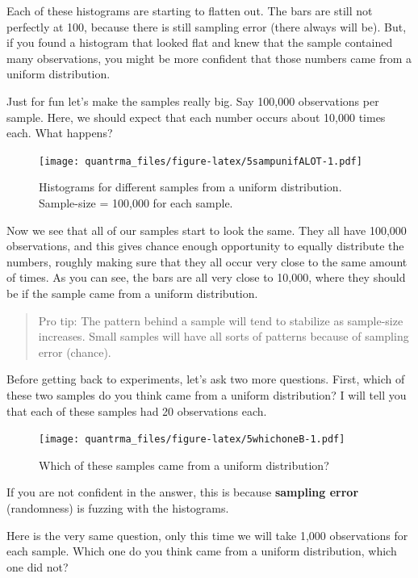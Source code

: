 \documentclass[
]{book}
\begin{document}
Each of these histograms are starting to flatten out. The bars are still not perfectly at 100, because there is still sampling error (there always will be). But, if you found a histogram that looked flat and knew that the sample contained many observations, you might be more confident that those numbers came from a uniform distribution.

Just for fun let's make the samples really big. Say 100,000 observations per sample. Here, we should expect that each number occurs about 10,000 times each. What happens?

\begin{figure}
\centering
\texttt{[image: quantrma\_files/figure-latex/5sampunifALOT-1.pdf]}
\caption{\label{fig:5sampunifALOT}Histograms for different samples from a uniform distribution. Sample-size = 100,000 for each sample.}
\end{figure}

Now we see that all of our samples start to look the same. They all have 100,000 observations, and this gives chance enough opportunity to equally distribute the numbers, roughly making sure that they all occur very close to the same amount of times. As you can see, the bars are all very close to 10,000, where they should be if the sample came from a uniform distribution.

\begin{quote}
Pro tip: The pattern behind a sample will tend to stabilize as sample-size increases. Small samples will have all sorts of patterns because of sampling error (chance).
\end{quote}

Before getting back to experiments, let's ask two more questions. First, which of these two samples do you think came from a uniform distribution? I will tell you that each of these samples had 20 observations each.

\begin{figure}
\centering
\texttt{[image: quantrma\_files/figure-latex/5whichoneB-1.pdf]}
\caption{\label{fig:5whichoneB}Which of these samples came from a uniform distribution?}
\end{figure}

If you are not confident in the answer, this is because \textbf{sampling error} (randomness) is fuzzing with the histograms.

Here is the very same question, only this time we will take 1,000 observations for each sample. Which one do you think came from a uniform distribution, which one did not?
\end{document}
